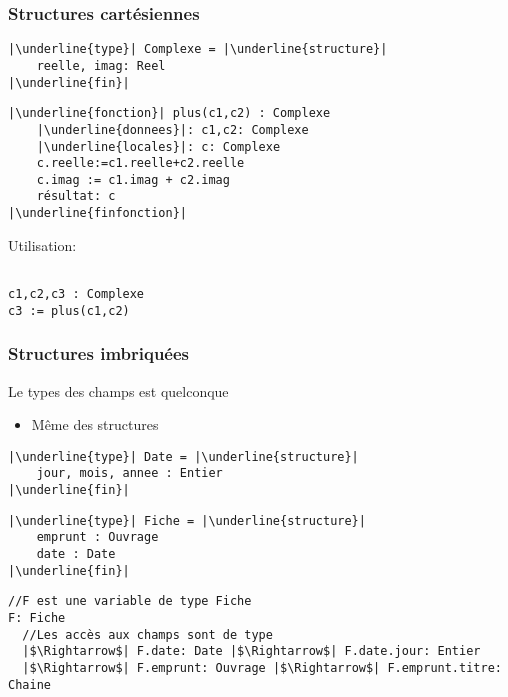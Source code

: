 \documentclass[table,handout,tikz,12pt,svgnames]{beamer}
\begin{document}
\begin{frame}[fragile=singleslide]
	\frametitle{Structures cartésiennes}
	\begin{verbatim}
|\underline{type}| Complexe = |\underline{structure}|
	reelle, imag: Reel
|\underline{fin}|
	\end{verbatim}
	\vspace{-0.9cm} \myline  \vspace{-0.7cm}	
	\begin{verbatim}
|\underline{fonction}| plus(c1,c2) : Complexe
	|\underline{donnees}|: c1,c2: Complexe
	|\underline{locales}|: c: Complexe
	c.reelle:=c1.reelle+c2.reelle
	c.imag := c1.imag + c2.imag
	résultat: c
|\underline{finfonction}|
	\end{verbatim}			
	\vspace{-0.9cm} \myline  \vspace{-0.5cm}	
Utilisation:	
	\begin{verbatim}

c1,c2,c3 : Complexe
c3 := plus(c1,c2)
	\end{verbatim}			
\end{frame}


\begin{frame}[fragile=singleslide]
	\frametitle{Structures imbriquées}
	\begin{itemize}
		\vspace{-0.9cm}
	\end{itemize}
	\vspace{-1.1cm} \myline  \vspace{-1.4cm}
	\begin{block}{}
		\begin{verbatim}
//F est une variable de type Fiche
F: Fiche 
  //Les accès aux champs sont de type
  |$\Rightarrow$| F.date: Date |$\Rightarrow$| F.date.jour: Entier
  |$\Rightarrow$| F.emprunt: Ouvrage |$\Rightarrow$| F.emprunt.titre: Chaine
		\end{verbatim}
	\end{block}		
\end{frame}
\end{document}
